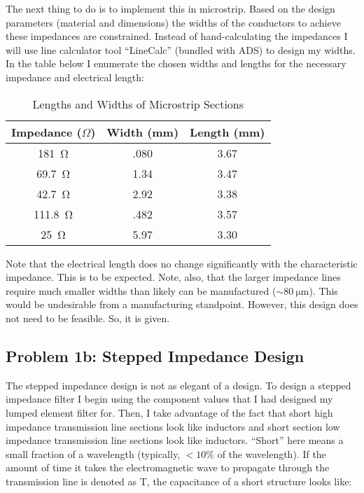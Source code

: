     The next thing to do is to implement this in microstrip. Based on the design
    parameters (material and dimensions) the widths of the conductors to achieve
    these impedances are constrained. Instead of hand-calculating the impedances
    I will use line calculator tool ``LineCalc'' (bundled with ADS) to design my
    widths. In the table below I enumerate the chosen widths and lengths for the necessary
    impedance and electrical length:

    \begin{table}[h]
        \centering
        \caption{Lengths and Widths of Microstrip Sections}
        \label{tab:1a_microstrip_dimensions}
        \begin{tabular}{|c|c|c|}
            \hline Impedance ($\Omega$) & Width (mm) & Length (mm)  \\
            \hline \SI{181}{\ohm}       & .080       & 3.67         \\
            \hline \SI{69.7}{\ohm}      & 1.34       & 3.47         \\
            \hline \SI{42.7}{\ohm}      & 2.92       & 3.38         \\
            \hline \SI{111.8}{\ohm}     & .482       & 3.57         \\
            \hline \SI{25}{\ohm}        & 5.97       & 3.30         \\
            \hline
        \end{tabular}
    \end{table}

    Note that the electrical length does no change significantly with the
    characteristic impedance. This is to be expected. Note, also, that the
    larger impedance lines require much smaller widths than likely can be
    manufactured ($\sim \SI{80}{\micro\meter} $). This would be undesirable from
    a manufacturing standpoint. However, this design does not need to be
    feasible. So, it is given.

    \subsection*{Problem 1b: Stepped Impedance Design}

    The stepped impedance design is not as elegant of a design. To design a
    stepped impedance filter I begin using the component values that I had
    designed my lumped element filter for. Then, I take advantage of the fact
    that short high impedance transmission line sections look like inductors and
    short section low impedance transmission line sections look like inductors.
    ``Short'' here means a small fraction of a wavelength (typically, $ < 10\%$
    of the wavelength). If the amount of time it takes the electromagnetic wave
    to propagate through the transmission line is denoted as T, the capacitance
    of a short structure looks like:


